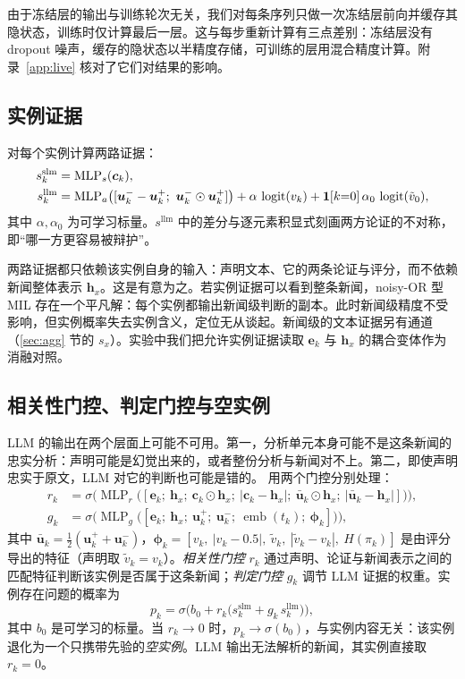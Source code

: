 由于冻结层的输出与训练轮次无关，我们对每条序列只做一次冻结层前向并缓存其隐状态，训练时仅计算最后一层。这与每步重新计算有三点差别：冻结层没有 dropout 噪声，缓存的隐状态以半精度存储，可训练的层用混合精度计算。附录~\ref{app:live} 核对了它们对结果的影响。

\subsection{实例证据}\label{sec:score}

对每个实例计算两路证据：
\begin{align}
s_k^{\mathrm{slm}} &= \operatorname{MLP}_s(\bm c_k),\\
s_k^{\mathrm{llm}} &= \operatorname{MLP}_a\!\big([\bm u_k^- - \bm u_k^+;\ \bm u_k^-\odot\bm u_k^+]\big)+\alpha\,\operatorname{logit}(v_k)+\mathbf{1}[k{=}0]\,\alpha_0\,\operatorname{logit}(\tilde v_0),
\end{align}
其中 $\alpha,\alpha_0$ 为可学习标量。$s^{\mathrm{llm}}$ 中的差分与逐元素积显式刻画两方论证的不对称，即“哪一方更容易被辩护”。

两路证据都只依赖该实例自身的输入：声明文本、它的两条论证与评分，而不依赖新闻整体表示 $\bm h_x$。这是有意为之。若实例证据可以看到整条新闻，noisy-OR 型 MIL 存在一个平凡解：每个实例都输出新闻级判断的副本。此时新闻级精度不受影响，但实例概率失去实例含义，定位无从谈起。新闻级的文本证据另有通道（\ref{sec:agg} 节的 $s_x$）。实验中我们把允许实例证据读取 $\bm e_k$ 与 $\bm h_x$ 的耦合变体作为消融对照。

\subsection{相关性门控、判定门控与空实例}\label{sec:gate}

LLM 的输出在两个层面上可能不可用。第一，分析单元本身可能不是这条新闻的忠实分析：声明可能是幻觉出来的，或者整份分析与新闻对不上。第二，即使声明忠实于原文，LLM 对它的判断也可能是错的。\method{} 用两个门控分别处理：
\begin{align}
r_k&=\sigma\!\Big(\operatorname{MLP}_r\big([\bm e_k;\ \bm h_x;\ \bm c_k\odot\bm h_x;\ |\bm c_k-\bm h_x|;\ \bar{\bm u}_k\odot\bm h_x;\ |\bar{\bm u}_k-\bm h_x|]\big)\Big),\label{eq:rk}\\
g_k&=\sigma\!\Big(\operatorname{MLP}_g\big([\bm e_k;\ \bm h_x;\ \bm u_k^+;\ \bm u_k^-;\ \operatorname{emb}(t_k);\ \bm\phi_k]\big)\Big),\label{eq:gk}
\end{align}
其中 $\bar{\bm u}_k=\tfrac12(\bm u_k^++\bm u_k^-)$，$\bm\phi_k=[v_k,\ |v_k-0.5|,\ \tilde v_k,\ |\tilde v_k-v_k|,\ H(\pi_k)]$ 是由评分导出的特征（声明取 $\tilde v_k=v_k$）。\emph{相关性门控} $r_k$ 通过声明、论证与新闻表示之间的匹配特征判断该实例是否属于这条新闻；\emph{判定门控} $g_k$ 调节 LLM 证据的权重。实例存在问题的概率为
\begin{equation}
p_k=\sigma\!\Big(b_0+r_k\big(s_k^{\mathrm{slm}}+g_k\,s_k^{\mathrm{llm}}\big)\Big),\label{eq:pk}
\end{equation}
其中 $b_0$ 是可学习的标量。当 $r_k\to0$ 时，$p_k\to\sigma(b_0)$，与实例内容无关：该实例退化为一个只携带先验的\emph{空实例}。LLM 输出无法解析的新闻，其实例直接取 $r_k=0$。

